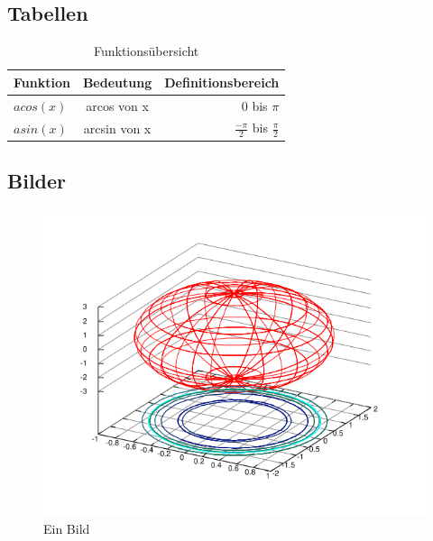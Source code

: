 \documentclass[a4paper, 11pt]{article}
\begin{document}
\subsection*{Tabellen} %
\begin{center}
\begin{table}[h] %
\begin{tabular}{ l | c || r } %
\hline %
\textbf{Funktion} & \textbf{Bedeutung} & \textbf{Definitionsbereich} \\ \hline\hline
$acos(x)$  & arcos von x & 0 bis $\pi$ \\ \hline
$asin(x)$  & arcsin von x & $\frac{-\pi}{2}$ bis $\frac{\pi}{2}$ \\ \hline
\end{tabular}
\caption{Funktionsübersicht}
\end{table}
\end{center}

\subsection{Bilder}
\begin{figure}[h]
\includegraphics[scale=0.5]{gnuplot.png} 
\caption{Ein Bild}
\end{figure}

%
%
\newpage
\listoftables  %
\listoffigures %
\end{document}
